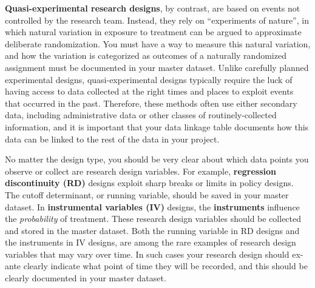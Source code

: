 \textbf{Quasi-experimental research designs},
by contrast, are based on events not controlled by the research team.
Instead, they rely on ``experiments of nature'',
in which natural variation in exposure to treatment
can be argued to approximate deliberate randomization.
You must have a way to measure this natural variation,
and how the variation is categorized as outcomes of a naturally randomized assignment
must be documented in your master dataset.
Unlike carefully planned experimental designs,
quasi-experimental designs typically require the luck
of having access to data collected at the right times and places
to exploit events that occurred in the past.
Therefore, these methods often use either secondary data,
including administrative data or other classes of routinely-collected information,
and it is important that your data linkage table documents
how this data can be linked to the rest of the data in your project.


No matter the design type, you should be very clear about
which data points you observe or collect are research design variables.
For example,
\textbf{regression discontinuity (RD)}
designs exploit sharp breaks or limits
in policy designs.
The cutoff determinant, or running variable,
should be saved in your master dataset.
In \textbf{instrumental variables (IV)}
designs, the \textbf{instruments} influence the \textit{probability} of treatment.
These research design variables should be collected
and stored in the master dataset.
Both the running variable in RD designs
and the instruments in IV designs,
are among the rare examples of research design variables
that may vary over time.
In such cases your research design should
ex-ante clearly indicate what point of time they will be recorded,
and this should be clearly documented in your master dataset.

